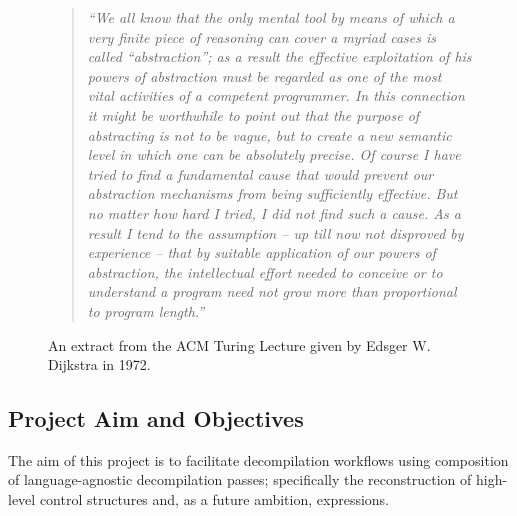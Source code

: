 \documentclass[12pt, a4paper]{article}
\begin{document}
\begin{figure}[htbp]
	\begin{quote}
		\textit{``We all know that the only mental tool by means of which a very finite piece of reasoning can cover a myriad cases is called ``abstraction''; as a result the effective exploitation of his powers of abstraction must be regarded as one of the most vital activities of a competent programmer. In this connection it might be worthwhile to point out that the purpose of abstracting is not to be vague, but to create a new semantic level in which one can be absolutely precise. Of course I have tried to find a fundamental cause that would prevent our abstraction mechanisms from being sufficiently effective. But no matter how hard I tried, I did not find such a cause. As a result I tend to the assumption -- up till now not disproved by experience -- that by suitable application of our powers of abstraction, the intellectual effort needed to conceive or to understand a program need not grow more than proportional to program length.''} \cite{abstractions_quote}
	\end{quote}
	\caption{An extract from the ACM Turing Lecture given by Edsger W. Dijkstra in 1972.}
	\label{dijkstra_lecture}
\end{figure}



\subsection{Project Aim and Objectives}

The aim of this project is to facilitate decompilation workflows using composition of language-agnostic decompilation passes; specifically the reconstruction of high-level control structures and, as a future ambition, expressions.
\end{document}
